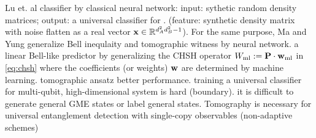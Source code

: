 \documentclass[
reprint,
aps,
pra,
]{revtex4-2}
\theoremstyle{plain}
\theoremstyle{definition}
\newtheorem{remark}{Remark}
\newcommand{\ew}{W}
\begin{document}
Lu et. al \cite{luSeparabilityEntanglementClassifierMachine2018} 
 classifier by classical neural network:
input: sythetic random density matrices;
output: a universal classifier for .
(feature: synthetic density matrix with noise flatten as a real vector $\vb{x}\in\mathbb{R}^{d_A^2d_B^2-1}$). 
For the same purpose, Ma and Yung \cite{maTransformingBellInequalities2018} generalize Bell inequlaity and tomographic witness by neural network. 
a linear Bell-like predictor by generalizing the CHSH operator $\ew_{\text{ml}}:=\vb{P}\cdot\vb{w}_{\text{ml}}$ in \cref{eq:chsh} where the coefficients (or weights) $\vb{w}$ are determined by machine learning.
tomographic ansatz better performance.
training a universal classifier for multi-qubit, high-dimensional system is hard (boundary).
it is difficult to generate general GME states or label general states.
Tomography is necessary for universal entanglement detection with single-copy observables (non-adaptive schemes) \cite{luTomographyNecessaryUniversal2016}
\end{document}
